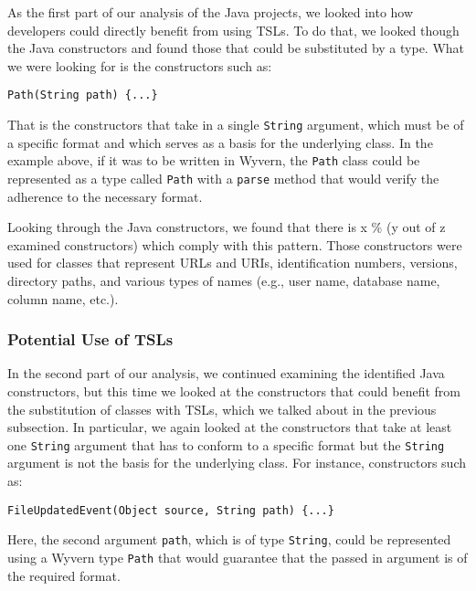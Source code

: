 As the first part of our analysis of the Java projects, we looked into how developers could directly benefit  from using TSLs. To do that, we looked though the Java constructors and found those that could be substituted by a type. What we were looking for is the constructors such as:

\begin{lstlisting}
Path(String path) {...}
\end{lstlisting}

That is the constructors that take in a single \lstinline{String} argument, which must be of a specific format and which serves as a basis for the underlying class. In the example above, if it was to be written in Wyvern, the \lstinline{Path} class could be represented as a type called \lstinline{Path} with a \lstinline{parse} method that would verify the adherence to the necessary format.

Looking through the Java constructors, we found that there is x \% (y out of z examined constructors) which comply with this pattern. Those constructors were used for classes that represent URLs and URIs, identification numbers, versions, directory paths, and various types of names (e.g., user name, database name, column name, etc.).

\subsubsection{Potential Use of TSLs}

In the second part of our analysis, we continued examining the identified Java constructors, but this time we looked at the constructors that could benefit from the substitution of classes with TSLs, which we talked about in the previous subsection. In particular, we again looked at the constructors that take at least one \lstinline{String} argument that has to conform to a specific format but the \lstinline{String} argument is not the basis for the underlying class. For instance, constructors such as:

\begin{lstlisting}
FileUpdatedEvent(Object source, String path) {...}
\end{lstlisting}

Here, the second argument \lstinline{path}, which is of type \lstinline{String}, could be represented using a Wyvern type \lstinline{Path} that would guarantee that the passed in argument is of the required format.


